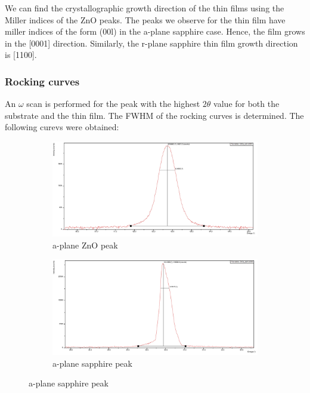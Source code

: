 \documentclass{article}
\begin{document}
	We can find the crystallographic growth direction of the thin films using the Miller indices of the ZnO peaks. The peaks we observe for the thin film have miller indices of the form (00l) in the a-plane sapphire case. Hence, the film grows in the [0001] direction. Similarly, the r-plane sapphire thin film growth direction is [1100].
\pagebreak{}
\subsubsection{Rocking curves}
An $\omega$ scan is performed for the peak with the highest $2\theta$ value for both the substrate and the thin film. The FWHM of the rocking curves is determined. The following curevs were obtained: 

\begin{figure}[h]
    \centering
    \begin{subfigure}[b]{0.45\textwidth}
        \centering
        \includegraphics[width=\textwidth]{Figures/w-scan-a-plane-sapphire-peaks.jpg} %
        \caption{a-plane ZnO peak}
        \label{fig:subfig1}
    \end{subfigure}
    \hfill
    \begin{subfigure}[b]{0.45\textwidth}
        \centering
        \includegraphics[width=\textwidth]{Figures/w-scan-ZnO-on-a-plane-sapphire-peaks.jpg} %
        \caption{a-plane sapphire peak}
        \label{fig:subfig2}
    \end{subfigure}
    

\end{figure}
\end{document}
